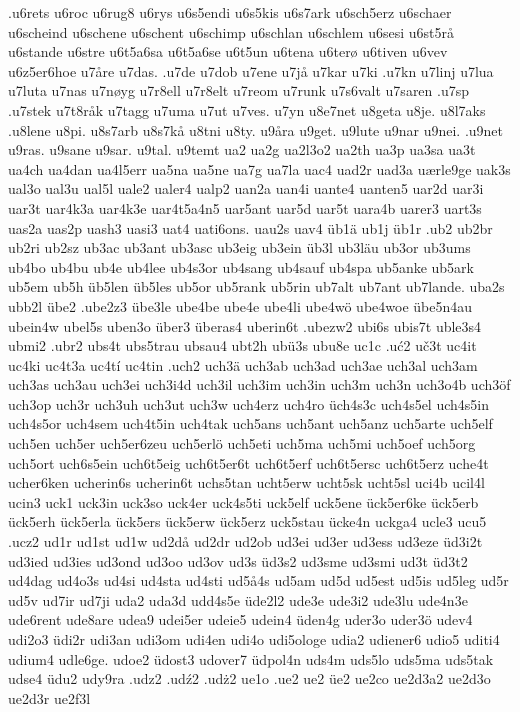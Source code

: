 {{.u6rets
u6roc
u6rug8
u6rys
u6s5endi
u6s5kis
u6s7ark
u6sch5erz
u6schaer
u6scheind
u6schene
u6schent
u6schimp
u6schlan
u6schlem
u6sesi
u6st5rå
u6stande
u6stre
u6t5a6sa
u6t5a6se
u6t5un
u6tena
u6terø
u6tiven
u6vev
u6z5er6hoe
u7åre
u7das.
.u7de
u7dob
u7ene
u7jå
u7kar
u7ki
.u7kn
u7linj
u7lua
u7luta
u7nas
u7nøyg
u7r8ell
u7r8elt
u7reom
u7runk
u7s6valt
u7saren
.u7sp
.u7stek
u7t8råk
u7tagg
u7uma
u7ut
u7ves.
u7yn
u8e7net
u8geta
u8je.
u8l7aks
.u8lene
u8pi.
u8s7arb
u8s7kå
u8tni
u8ty.
u9åra
u9get.
u9lute
u9nar
u9nei.
.u9net
u9ras.
u9sane
u9sar.
u9tal.
u9temt
ua2
ua2g
ua2l3o2
ua2th
ua3p
ua3sa
ua3t
ua4ch
ua4dan
ua4l5err
ua5na
ua5ne
ua7g
ua7la
uac4
uad2r
uad3a
uærle9ge
uak3s
ual3o
ual3u
ual5l
uale2
ualer4
ualp2
uan2a
uan4i
uante4
uanten5
uar2d
uar3i
uar3t
uar4k3a
uar4k3e
uar4t5a4n5
uar5ant
uar5d
uar5t
uara4b
uarer3
uart3s
uas2a
uas2p
uash3
uasi3
uat4
uati6ons.
uau2s
uav4
üb1ä
ub1j
üb1r
.ub2
ub2br
ub2ri
ub2sz
ub3ac
ub3ant
ub3asc
ub3eig
ub3ein
üb3l
ub3läu
ub3or
ub3ums
ub4bo
ub4bu
ub4e
ub4lee
ub4s3or
ub4sang
ub4sauf
ub4spa
ub5anke
ub5ark
ub5em
ub5h
üb5len
üb5les
ub5or
ub5rank
ub5rin
ub7alt
ub7ant
ub7lande.
uba2s
ubb2l
übe2
.ube2z3
übe3le
ube4be
ube4e
ube4li
ube4wö
ube4woe
übe5n4au
ubein4w
ubel5s
uben3o
über3
überas4
uberin6t
.ubezw2
ubi6s
ubis7t
uble3s4
ubmi2
.ubr2
ubs4t
ubs5trau
ubsau4
ubt2h
ubü3s
ubu8e
uc1c
.uć2
uč3t
uc4it
uc4ki
uc4t3a
uc4tí
uc4tin
.uch2
uch3ä
uch3ab
uch3ad
uch3ae
uch3al
uch3am
uch3as
uch3au
uch3ei
uch3i4d
uch3il
uch3im
uch3in
uch3m
uch3n
uch3o4b
uch3öf
uch3op
uch3r
uch3uh
uch3ut
uch3w
uch4erz
uch4ro
üch4s3c
uch4s5el
uch4s5in
uch4s5or
uch4sem
uch4t5in
uch4tak
uch5ans
uch5ant
uch5anz
uch5arte
uch5elf
uch5en
uch5er
uch5er6zeu
uch5erlö
uch5eti
uch5ma
uch5mi
uch5oef
uch5org
uch5ort
uch6s5ein
uch6t5eig
uch6t5er6t
uch6t5erf
uch6t5ersc
uch6t5erz
uche4t
ucher6ken
ucherin6s
ucherin6t
uchs5tan
ucht5erw
ucht5sk
ucht5sl
uci4b
ucil4l
ucin3
uck1
uck3in
uck3so
uck4er
uck4s5ti
uck5elf
uck5ene
ück5er6ke
ück5erb
ück5erh
ück5erla
ück5ers
ück5erw
ück5erz
uck5stau
ücke4n
uckga4
ucle3
ucu5
.ucz2
ud1r
ud1st
ud1w
ud2då
ud2dr
ud2ob
ud3ei
ud3er
ud3ess
ud3eze
üd3i2t
ud3ied
ud3ies
ud3ond
ud3oo
ud3ov
ud3s
üd3s2
ud3sme
ud3smi
ud3t
üd3t2
ud4dag
ud4o3s
ud4si
ud4sta
ud4sti
ud5å4s
ud5am
ud5d
ud5est
ud5is
ud5leg
ud5r
ud5v
ud7ir
ud7ji
uda2
uda3d
udd4s5e
üde2l2
ude3e
ude3i2
ude3lu
ude4n3e
ude6rent
ude8are
udea9
udei5er
udeie5
udein4
üden4g
uder3o
uder3ö
udev4
udi2o3
üdi2r
udi3an
udi3om
udi4en
udi4o
udi5ologe
udia2
udiener6
udio5
uditi4
udium4
udle6ge.
udoe2
üdost3
udover7
üdpol4n
uds4m
uds5lo
uds5ma
uds5tak
udse4
üdu2
udy9ra
.udz2
.udź2
.udż2
ue1o
.ue2
ue2
üe2
ue2co
ue2d3a2
ue2d3o
ue2d3r
ue2f3l
}}
